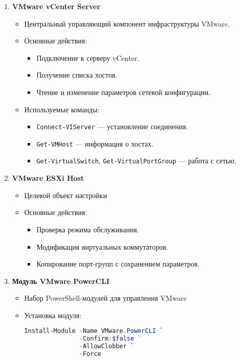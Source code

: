 \begin{enumerate}
    \item \textbf{VMware vCenter Server}
    \begin{itemize}
        \item Центральный управляющий компонент инфраструктуры VMware.
        \item Основные действия:
        \begin{itemize}
            \item Подключение к серверу vCenter.
            \item Получение списка хостов.
            \item Чтение и изменение параметров сетевой конфигурации.
        \end{itemize}
        \item Используемые команды:
        \begin{itemize}
            \item \texttt{Connect-VIServer} — установление соединения.
            \item \texttt{Get-VMHost} — информация о хостах.
            \item \texttt{Get-VirtualSwitch}, \texttt{Get-VirtualPortGroup} — работа с сетью.
        \end{itemize}
    \end{itemize}
    
    \item \textbf{VMware ESXi Host}
    \begin{itemize}
        \item Целевой объект настройки
        \item Основные действия:
        \begin{itemize}
            \item Проверка режима обслуживания.
            \item Модификация виртуальных коммутаторов.
            \item Копирование порт-групп с сохранением параметров.
        \end{itemize}
    \end{itemize}
    
    \item \textbf{Модуль VMware PowerCLI}
    \begin{itemize}
        \item Набор PowerShell-модулей для управления VMware
        \item Установка модуля:
\begin{lstlisting}[language=PowerShell, basicstyle=\small\ttfamily]
Install-Module -Name VMware.PowerCLI `
               -Confirm:$false `
               -AllowClobber `
               -Force
\end{lstlisting}
    \end{itemize}
\end{enumerate}

